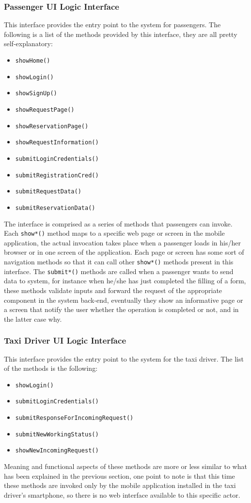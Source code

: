 \subsubsection{Passenger UI Logic Interface}
This interface provides the entry point to the system for passengers. \newline
The following is a list of the methods provided by this interface, they are all pretty self-explanatory:
\begin{itemize}
	\item \texttt{showHome()}
	\item \texttt{showLogin()}
	\item \texttt{showSignUp()}
	\item \texttt{showRequestPage()}
	\item \texttt{showReservationPage()}
	\item \texttt{showRequestInformation()}
	\item \texttt{submitLoginCredentials()}
	\item \texttt{submitRegistrationCred()}
	\item \texttt{submitRequestData()}
	\item \texttt{submitReservationData()}
\end{itemize}
The interface is comprised as a series of methods that passengers can invoke. Each \texttt{show*()} method maps to a specific web page or screen in the mobile application, the actual invocation takes place when a passenger loads in his/her browser or in one screen of the application. Each page or screen has some sort of navigation methods so that it can call other \texttt{show*()} methods present in this interface. \newline
The \texttt{submit*()} methods are called when a passenger wants to send data to system, for instance when he/she has just completed the filling of a form, these methods validate inputs and forward the request of the appropriate component in the system back-end, eventually they show an informative page or a screen that notify the user whether the operation is completed or not, and in the latter case why. 
\subsubsection{Taxi Driver UI Logic Interface}
This interface provides the entry point to the system for the taxi driver.
The list of the methods is the following:
\begin{itemize}
	\item \texttt{showLogin()}
	\item \texttt{submitLoginCredentials()}
	\item \texttt{submitResponseForIncomingRequest()}
	\item \texttt{submitNewWorkingStatus()}
	\item \texttt{showNewIncomingRequest()}
\end{itemize}
Meaning and functional aspects of these methods are more or less similar to what has been explained in the previous section, one point to note is that this time these methods are invoked only by the mobile application installed in the taxi driver's smartphone, so there is no web interface available to this specific actor.
